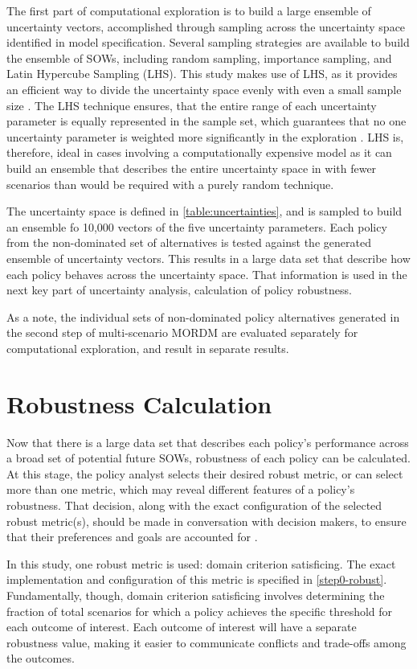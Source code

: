 The first part of computational exploration is to build a large ensemble of uncertainty vectors, accomplished through sampling across the uncertainty space identified in model specification. Several sampling strategies are available to build the ensemble of SOWs, including random sampling, importance sampling, and Latin Hypercube Sampling (LHS). This study makes use of LHS, as it provides an efficient way to divide the uncertainty space evenly with even a small sample size \citep{Helton2006}. The LHS technique ensures, that the entire range of each uncertainty parameter is equally represented in the sample set, which guarantees that no one uncertainty parameter is weighted more significantly in the exploration \citep{Mckay1979}. LHS is, therefore, ideal in cases involving a computationally expensive model as it can build an ensemble that describes the entire uncertainty space in with fewer scenarios than would be required with a purely random technique. 

The uncertainty space is defined in \cref{table:uncertainties}, and is sampled to build an ensemble fo 10,000 vectors of the five uncertainty parameters. Each policy from the non-dominated set of alternatives is tested against the generated ensemble of uncertainty vectors. This results in a large data set that describe how each policy behaves across the uncertainty space. That information is used in the next key part of uncertainty analysis, calculation of policy robustness. 

As a note, the individual sets of non-dominated policy alternatives generated in the second step of multi-scenario MORDM are evaluated separately for computational exploration, and result in separate results. 

\section{Robustness Calculation}\label{step3-robust}
Now that there is a large data set that describes each policy's performance across a broad set of potential future SOWs, robustness of each policy can be calculated. At this stage, the policy analyst selects their desired robust metric, or can select more than one metric, which may reveal different features of a policy's robustness. That decision, along with the exact configuration of the selected robust metric(s), should be made in conversation with decision makers, to ensure that their preferences and goals are accounted for \citep{Kasprzyk2013}. 

In this study, one robust metric is used: domain criterion satisficing. The exact implementation and configuration of this metric is specified in \cref{step0-robust}. Fundamentally, though, domain criterion satisficing involves determining the fraction of total scenarios for which a policy achieves the specific threshold for each outcome of interest. Each outcome of interest will have a separate robustness value, making it easier to communicate conflicts and trade-offs among the outcomes.
